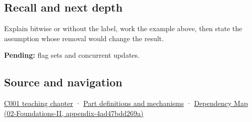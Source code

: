 \subsection{Recall and next depth}\label{appendix-a427ce8ce8a6-recall-and-next-depth}

Explain bitwise or without the label, work the example above, then state the assumption whose removal would change the result.

\textbf{Pending:} flag sets and concurrent updates.

\subsection{Source and navigation}\label{appendix-a427ce8ce8a6-source-and-navigation}

\hyperref[01-foundations-i-ch001-from-a-signal-to-an-interpretation]{C001 teaching chapter} · \hyperref[appendix-fd090d982a15]{Part definitions and mechanisms} · \href{../02-Foundations-II/main.pdf\#nameddest=appendix-4ad47bdd269a}{Dependency Map (02-Foundations-II, appendix-4ad47bdd269a)}
